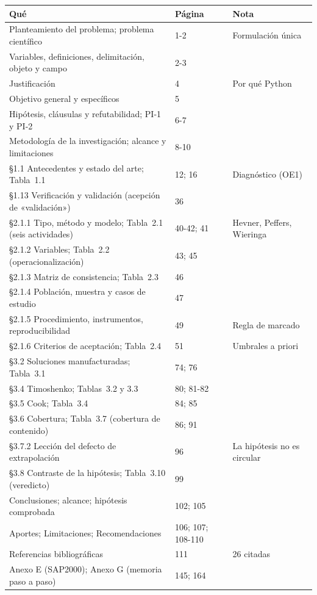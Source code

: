 \documentclass[11pt,a4paper]{article}
\begin{document}
{\small
\begin{longtable}{@{}L{8.2cm}L{2.1cm}L{5.3cm}@{}}
\toprule
\textbf{Qué} & \textbf{Página} & \textbf{Nota}\\
\midrule\endhead
\bottomrule\endfoot
Planteamiento del problema; problema científico & 1-2 & Formulación única\\
Variables, definiciones, delimitación, objeto y campo & 2-3 & \\
Justificación & 4 & Por qué Python\\
Objetivo general y específicos & 5 & \\
Hipótesis, cláusulas y refutabilidad; PI-1 y PI-2 & 6-7 & \\
Metodología de la investigación; alcance y limitaciones & 8-10 & \\
§1.1 Antecedentes y estado del arte; Tabla~1.1 & 12; 16 & Diagnóstico (OE1)\\
§1.13 Verificación y validación (acepción de «validación») & 36 & \\
§2.1.1 Tipo, método y modelo; Tabla~2.1 (seis actividades) & 40-42; 41 & Hevner, Peffers, Wieringa\\
§2.1.2 Variables; Tabla~2.2 (operacionalización) & 43; 45 & \\
§2.1.3 Matriz de consistencia; Tabla~2.3 & 46 & \\
§2.1.4 Población, muestra y casos de estudio & 47 & \\
§2.1.5 Procedimiento, instrumentos, reproducibilidad & 49 & Regla de marcado\\
§2.1.6 Criterios de aceptación; Tabla~2.4 & 51 & Umbrales a priori\\
§3.2 Soluciones manufacturadas; Tabla~3.1 & 74; 76 & \\
§3.4 Timoshenko; Tablas~3.2 y 3.3 & 80; 81-82 & \\
§3.5 Cook; Tabla~3.4 & 84; 85 & \\
§3.6 Cobertura; Tabla~3.7 (cobertura de contenido) & 86; 91 & \\
§3.7.2 Lección del defecto de extrapolación & 96 & La hipótesis no es circular\\
§3.8 Contraste de la hipótesis; Tabla~3.10 (veredicto) & 99 & \\
Conclusiones; alcance; hipótesis comprobada & 102; 105 & \\
Aportes; Limitaciones; Recomendaciones & 106; 107; 108-110 & \\
Referencias bibliográficas & 111 & 26 citadas\\
Anexo E (SAP2000); Anexo G (memoria paso a paso) & 145; 164 & \\
\end{longtable}}
\end{document}
